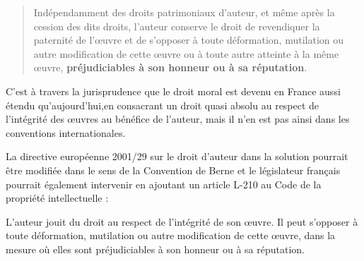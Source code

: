 \begin{quotation}
Indépendamment des droits patrimoniaux d’auteur, et même après la cession des dits droits, l’auteur conserve le droit de revendiquer la paternité de l’œuvre et de s’opposer à toute déformation, mutilation ou autre modification de cette œuvre ou à toute autre atteinte à la même œuvre, \textbf{préjudiciables à son honneur ou à sa réputation}.
\end{quotation}

C’est à travers la jurisprudence que le droit moral est devenu en France aussi étendu qu’aujourd’hui,en consacrant un droit quasi absolu au respect de l'intégrité des œuvres au bénéfice de l'auteur, mais il n'en est pas ainsi dans les conventions internationales.

La directive européenne 2001/29 sur le droit d'auteur dans la solution pourrait être modifiée dans le sens de la Convention de Berne et le législateur français pourrait également intervenir en ajoutant un article L-210 au Code de la propriété intellectuelle :

\begin{mesure}
L’auteur jouit du droit au respect de l’intégrité de son œuvre. Il peut s’opposer à toute déformation, mutilation ou autre modification de cette œuvre, dans la mesure où elles sont préjudiciables à son honneur ou à sa réputation.
\end{mesure}

